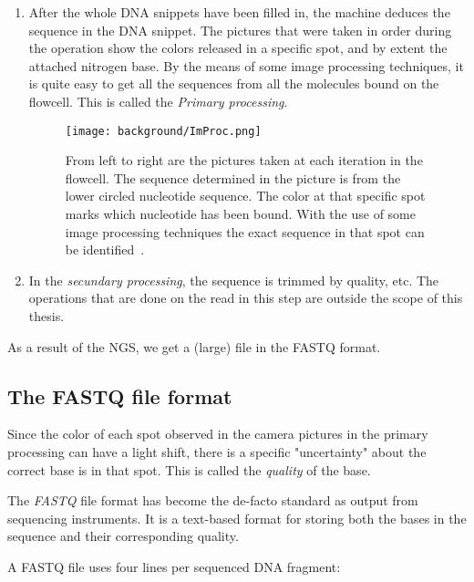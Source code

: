 \begin{enumerate}
	\item After the whole DNA snippets have been filled in, the machine deduces the sequence in the DNA snippet. The pictures that were taken in order during the operation show the colors released in a specific spot, and by extent the attached nitrogen base. By the means of some image processing techniques, it is quite easy to get all the sequences from all the molecules bound on the flowcell. This is called the \emph{Primary processing}.
	
	\begin{figure}[H]
		\centering
		\texttt{[image: background/ImProc.png]}
		\caption{From left to right are the pictures taken at each iteration in the flowcell. The sequence determined in the picture is from the lower circled nucleotide sequence. The color at that specific spot marks which nucleotide has been bound. With the use of some image processing techniques the exact sequence in that spot can be identified~\cite{pptHowest}.}
		\label{fig:ImProc}
	\end{figure}
	
	\item In the \emph{secundary processing}, the sequence is trimmed by quality, etc. The operations that are done on the read in this step are outside the scope of this thesis.
\end{enumerate}

As a result of the NGS, we get a (large) file in the FASTQ format.

\subsection{The FASTQ file format}
\label{expl:FASTQ}

Since the color of each spot observed in the camera pictures in the primary processing can have a light shift, there is a specific "uncertainty" about the correct base is in that spot. This is called the \emph{quality} of the base.

The \emph{FASTQ} file format has become the de-facto standard as output from sequencing instruments. It is a text-based format for storing both the bases in the sequence and their corresponding quality.

A FASTQ file uses four lines per sequenced DNA fragment:

